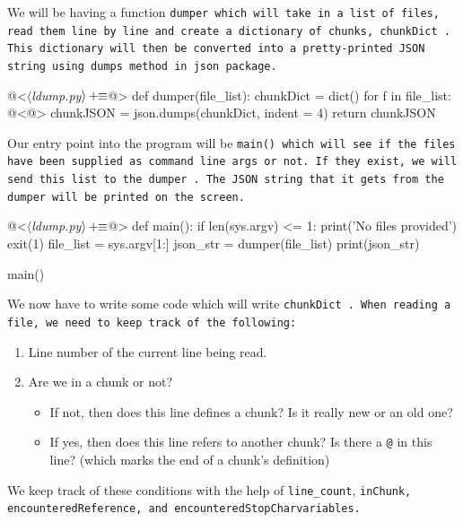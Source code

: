 We will be having a function \tt dumper \rm which will take in a list of files, read them line by line and
create a dictionary of chunks, \tt chunkDict \rm. This dictionary will then be converted into a pretty-printed
JSON string using \tt dumps \rm method in \tt json \rm package.

\begin{oldcode}
@<$\langle$\textit{ldump.py}$\rangle \thinspace +\!\!\equiv$@>
def dumper(file_list):
    chunkDict = dict()
    for f in file_list:
        @<@>
    chunkJSON = json.dumps(chunkDict, indent = 4)
    return chunkJSON

\end{oldcode}

Our entry point into the program will be \tt main() \rm which will see if the files have been supplied as
command line args or not. If they exist, we will send this list to the \tt dumper \rm. The JSON string that it
gets from the \tt dumper \rm will be printed on the screen.

\begin{oldcode}
@<$\langle$\textit{ldump.py}$\rangle \thinspace +\!\!\equiv$@>
def main():
    if len(sys.argv) <= 1:
        print('No files provided')
        exit(1)
    file_list = sys.argv[1:]
    json_str = dumper(file_list)
    print(json_str)

main()
\end{oldcode}

We now have to write some code which will write \tt chunkDict \rm. When reading a file, we need to keep track
of the following:

\begin{enumerate}
    \item Line number of the current line being read.
    \item Are we in a chunk or not?
        \begin{itemize}
            \item If not, then does this line defines a chunk? Is it really new or an old one?
            \item If yes, then does this line refers to another chunk? Is there a \verb|@| in this line?
            (which marks the end of a chunk's definition)
        \end{itemize}
\end{enumerate}

We keep track of these conditions with the help of \verb|line_count|, \tt inChunk\rm, \tt
encounteredReference\rm, and \tt encounteredStopChar\rm variables.

